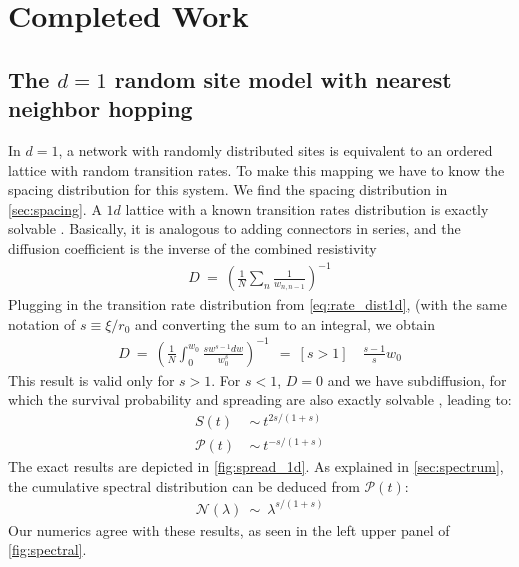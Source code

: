 \chapter{Completed Work}



\section{The $d=1$ random site model with nearest neighbor hopping}

In $d=1$, a network with randomly distributed sites is equivalent to
an ordered lattice with random transition rates. To make this mapping
we have to know the spacing distribution for this system. We find the
spacing distribution in \autoref{sec:spacing}. A $1d$ lattice with
a known transition rates distribution is exactly solvable \cite{alexander_excitation_1981}.
Basically, it is analogous to adding connectors in series, and 
the diffusion coefficient is the inverse of the combined resistivity
%
\begin{align}
D \ =\ \left(\frac{1}{N} \sum_n \frac{1}{w_{n,n-1}}\right)^{-1}
\end{align}
%
Plugging in the transition rate distribution from \ref{eq:rate_dist1d},
(with the same notation of $s \equiv \xi/r_0$ and converting the sum to an integral, we obtain
%
\begin{align}
D \ =\ \left(\frac{1}{N} \int_0^{w_0} \frac{s w^{s-1}dw}{w_0^s}\right)^{-1} \
\ =\ [s>1]\quad \frac{s-1}{s}w_0
\end{align}
This result is valid only for $s>1$. For $s<1$, $D=0$ and we have
subdiffusion, for which the survival probability and spreading 
are also exactly solvable \cite{alexander_excitation_1981}, leading to:
%
\begin{align}
S(t)           \ &\sim \ t^{2s/(1+s)} \\
\mathcal{P}(t) \ &\sim \ t^{-s/(1+s)}
\end{align}
%
The exact results are depicted in \autoref{fig:spread_1d}. 
As explained in \ref{sec:spectrum}, the cumulative spectral distribution
can be deduced from $\mathcal{P}(t)$:
%
\begin{align}
\mathcal{N}(\lambda) \ \sim\ \lambda^{s/(1+s)}
\end{align}
%
Our numerics agree with these results, as seen in the left upper
panel of \autoref{fig:spectral}.

